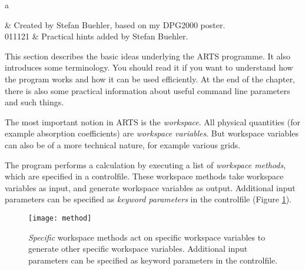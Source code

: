 a%
%
 \label{sec:concept}

%
%
 & Created by Stefan Buehler, based on my DPG2000 poster.\\
  011121 & Practical hints added by Stefan Buehler.
\stophistory

%
%
%

%
%
This section describes the basic ideas underlying the ARTS programme.
It also introduces some terminology. You should read it if you want to
understand how the program works and how it can be used efficiently.
At the end of the chapter, there is also some practical information
about useful command line parameters and such things.



\label{sec:concept:arts}

The most important notion in ARTS is the \emph{workspace}. All
physical quantities (for example absorption coefficients) are
\emph{workspace variables}. But workspace variables can also be of
a more technical nature, for example various grids. 

The program performs a calculation by executing a list of
\emph{workspace methods}, which are specified in a
controlfile. These workspace methods take workspace variables as
input, and generate workspace variables as output. Additional
input parameters can be specified as \emph{keyword parameters} in
the controlfile (Figure \ref{fig:method}).

\begin{figure}
  \begin{center}
    \texttt{[image: method]}
    \caption{\emph{Specific}
        workspace methods act on specific workspace variables to
        generate other specific workspace variables. Additional input
        parameters can be specified as keyword parameters in the
        controlfile.}
    \label{fig:method}
  \end{center}
\end{figure}

